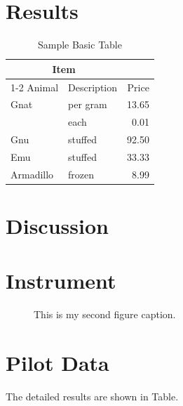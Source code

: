 \documentclass[stu]{apa7}
\begin{document}
\section{Results}

\begin{table}
  \caption{Sample Basic Table}
  \label{tab:BasicTable}
  \begin{tabular}{@{}llr@{}}         \toprule
  \multicolumn{2}{c}{Item}        \\ \cmidrule(r){1-2}
  Animal    & Description & Price \\ \midrule
  Gnat      & per gram    & 13.65 \\
            & each        &  0.01 \\
  Gnu       & stuffed     & 92.50 \\
  Emu       & stuffed     & 33.33 \\
  Armadillo & frozen      &  8.99 \\ \bottomrule
  \end{tabular}
\end{table}


\section{Discussion}
\lipsum[17]

\lipsum[18]

\lipsum[19]

\printbibliography

\appendix

\section{Instrument}
\label{app:instrument}


\begin{figure}
    \caption{This is my second figure caption.}
    \label{fig:Figure2}
\end{figure}

\lipsum[21]
\section{Pilot Data}
\label{app:surveydata}

The detailed results are shown in Table. \lipsum[22]
\end{document}
